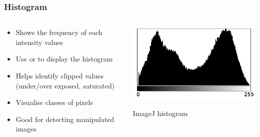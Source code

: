 \documentclass[ignorenonframetext,aspectratio=169,10pt,xcolor=table]{beamer}
\begin{document}
\begin{frame}
  \frametitle{Histogram}
  \begin{columns}
    \begin{column}{0.5\textwidth}
      \begin{itemize}\setlength\itemsep{1em}
      \item Shows the frequency of each intensity values
      \item Use  or  to display the
        histogram
      \item Helps identify clipped values (under/over exposed, saturated)
      \item Visualise classes of pixels
      \item Good for detecting manipulated images
      \end{itemize}
    \end{column}
    \begin{column}{0.5\textwidth}
      \begin{center}
        \includegraphics[width=\textwidth]{histogram}

      {\tiny ImageJ histogram}
      \end{center}
    \end{column}
  \end{columns}
\end{frame}
\end{document}
